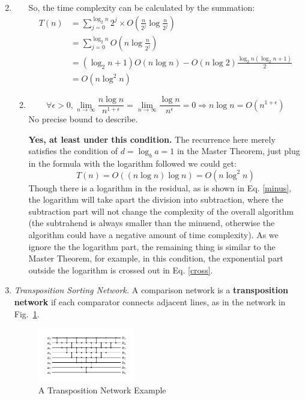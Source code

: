 \documentclass[12pt,a4paper]{article}
\makeatletter
\newtheorem*{solution}{Solution}
\theoremstyle{definition}
\renewenvironment{solution}[1][Solution] {\par\pushQED{\qed}\normalfont\topsep6\p@\@plus6\p@\relax\trivlist\item[\hskip\labelsep\bfseries#1\@addpunct{.}]\ignorespaces}{\popQED\endtrivlist\@endpefalse} \makeatother
\makeatother
\begin{document}
\begin{enumerate}
\begin{solution}
\begin{enumerate}
    So, the time complexity can be calculated by the summation:
    \begin{align}
        T(n) &= \sum_{j=0}^{\log_2 n} 2^j\times O\left(\frac{n}{2^j}\log\frac{n}{2^j}\right)\nonumber\\
        &=\sum_{j=0}^{\log_2 n} O\left(n\log \frac{n}{2^j}\right)\label{cross}\\
        &=(\log_2 n + 1)O(n\log n)-O(n\log 2)\frac{\log_2 n(\log_2 n+1)}{2}\label{minus}\\
        &= O(n\log^2 n)\nonumber
    \end{align}
    \item \par
    \begin{equation*}
        \forall \epsilon >0, \lim_{n\rightarrow \infty}\frac{n\log n}{n^{1+\epsilon}} =\lim_{n\rightarrow \infty} \frac{\log n}{n^\epsilon} = 0 \Rightarrow n\log n =O(n^{1+\epsilon})
    \end{equation*}
    No precise bound to describe.
    \begin{tcolorbox}[skin=mycross]
    \textbf{Yes, at least under this condition.} The recurrence here merely satisfies the condition of $d=\log_b a=1$ in the Master Theorem, just plug in the formula with the logarithm followed we could get:
    \begin{equation*}
        T(n) = O((n\log n)\log n) = O(n\log^2 n)
    \end{equation*}
    Though there is a logarithm in the residual, as is shown in Eq. \eqref{minus}, the logarithm will take apart the division into subtraction, where the subtraction part will not change the complexity of the overall algorithm (the subtrahend is always smaller than the minuend, otherwise the algorithm could have a negative amount of time complexity). As we ignore the the logarithm part, the remaining thing is similar to the Master Theorem, for example, in this condition, the exponential part outside the logarithm is crossed out in Eq. \eqref{cross}.
\end{tcolorbox}
\end{enumerate}
\end{solution}
\item
\textit{Transposition Sorting Network.} A comparison network is a \textbf{transposition network}  if each comparator connects adjacent lines, as in the network in Fig.~\ref{Fig-Transposition}.

\begin{figure}[H]
    \centering
    \includegraphics[width=0.4\textwidth]{img/Fig-Transposition.pdf}
    \caption{A Transposition Network Example}\label{Fig-Transposition}
\end{figure}


\end{enumerate}
\end{document}
